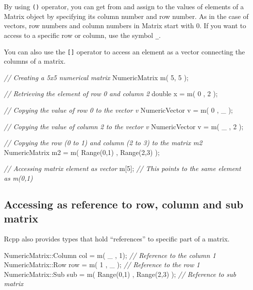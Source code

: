 \documentclass[]{book}
\newenvironment{Shaded}{\begin{snugshade}}{\end{snugshade}}
\newcommand{\DataTypeTok}[1]{\textcolor[rgb]{0.13,0.29,0.53}{#1}}
\newcommand{\DecValTok}[1]{\textcolor[rgb]{0.00,0.00,0.81}{#1}}
\newcommand{\CommentTok}[1]{\textcolor[rgb]{0.56,0.35,0.01}{\textit{#1}}}
\newcommand{\NormalTok}[1]{#1}
\theoremstyle{definition}
\theoremstyle{definition}
\theoremstyle{remark}
\begin{document}
By using \texttt{()} operator, you can get from and assign to the values
of elements of a Matrix object by specifying its column number and row
number. As in the case of vectors, row numbers and column numbers in
Matrix start with 0. If you want to access to a specific row or column,
use the symbol \texttt{\_}.

You can also use the \texttt{{[}{]}} operator to access an element as a
vector connecting the columns of a matrix.

\begin{Shaded}
\begin{Highlighting}[]
\CommentTok{// Creating a 5x5 numerical matrix}
\NormalTok{NumericMatrix m( }\DecValTok{5}\NormalTok{, }\DecValTok{5}\NormalTok{ );}

\CommentTok{// Retrieving the element of row 0 and column 2}
\DataTypeTok{double}\NormalTok{ x = m( }\DecValTok{0}\NormalTok{ , }\DecValTok{2}\NormalTok{ );}

\CommentTok{// Copying the value of row 0 to the vector v}
\NormalTok{NumericVector v = m( }\DecValTok{0}\NormalTok{ , _ );}

\CommentTok{// Copying the value of column 2 to the vector v}
\NormalTok{NumericVector v = m( _ , }\DecValTok{2}\NormalTok{ );}

\CommentTok{// Copying the row (0 to 1) and column (2 to 3) to the matrix m2}
\NormalTok{NumericMatrix m2 = m( Range(}\DecValTok{0}\NormalTok{,}\DecValTok{1}\NormalTok{) , Range(}\DecValTok{2}\NormalTok{,}\DecValTok{3}\NormalTok{) );}

\CommentTok{// Accessing matrix element as vector}
\NormalTok{m[}\DecValTok{5}\NormalTok{]; }\CommentTok{// This points to the same element as m(0,1)}
\end{Highlighting}
\end{Shaded}

\subsection{Accessing as reference to row, column and sub
matrix}\label{accessing-as-reference-to-row-column-and-sub-matrix}

Rcpp also provides types that hold ``references'' to specific part of a
matrix.

\begin{Shaded}
\begin{Highlighting}[]
\NormalTok{NumericMatrix::Column col = m( _ , }\DecValTok{1}\NormalTok{);  }\CommentTok{// Reference to the column 1}
\NormalTok{NumericMatrix::Row    row = m( }\DecValTok{1}\NormalTok{ , _ ); }\CommentTok{// Reference to the row 1}
\NormalTok{NumericMatrix::Sub    sub = m( Range(}\DecValTok{0}\NormalTok{,}\DecValTok{1}\NormalTok{) , Range(}\DecValTok{2}\NormalTok{,}\DecValTok{3}\NormalTok{) ); }\CommentTok{// Reference to sub matrix}
\end{Highlighting}
\end{Shaded}
\end{document}
